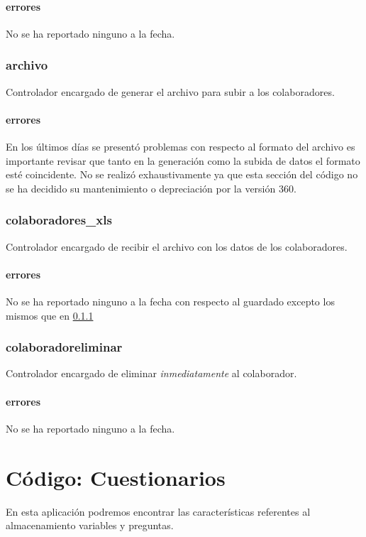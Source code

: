 \documentclass[10pt,a4paper]{book}
\begin{document}
	\subsubsection{errores}
	No se ha reportado ninguno a la fecha.

	\subsection{archivo}
	Controlador encargado de generar el archivo para subir a los colaboradores.
	\subsubsection{errores}\label{e_archivo}
	En los últimos días se presentó problemas con respecto al formato del archivo es importante revisar que tanto en la generación como la subida de datos el formato esté coincidente. No se realizó exhaustivamente ya que esta sección del código no se ha decidido su mantenimiento o depreciación por la versión 360.

	\subsection{colaboradores\_xls}
	Controlador encargado de recibir el archivo con los datos de los colaboradores.
	\subsubsection{errores}
	No se ha reportado ninguno a la fecha con respecto al guardado excepto los mismos que en \ref{e_archivo}

	\subsection{colaboradoreliminar}
	Controlador encargado de eliminar \textit{inmediatamente} al colaborador.
	\subsubsection{errores}
	No se ha reportado ninguno a la fecha.


	\chapter{Código: Cuestionarios}

	En esta aplicación podremos encontrar las características referentes al almacenamiento variables y preguntas.
\end{document}
